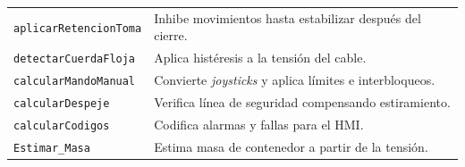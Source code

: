 \documentclass[a4paper,10pt,onecolumn,journal]{ieeeconf}
\numberwithin{equation}{section}
\begin{document}
\begin{table}[H]
\begin{tabular}{L{5.2cm} L{8.5cm}}
\texttt{aplicarRetencionToma} & Inhibe movimientos hasta estabilizar después del cierre.\\
\texttt{detectarCuerdaFloja} & Aplica histéresis a la tensión del cable.\\
\texttt{calcularMandoManual} & Convierte \textit{joysticks} y aplica límites e interbloqueos.\\
\texttt{calcularDespeje} & Verifica línea de seguridad compensando estiramiento.\\
\texttt{calcularCodigos} & Codifica alarmas y fallas para el HMI.\\
\texttt{Estimar\_Masa} & Estima masa de contenedor a partir de la tensión.\\
\bottomrule
\end{tabular}
\end{table}
\end{document}

